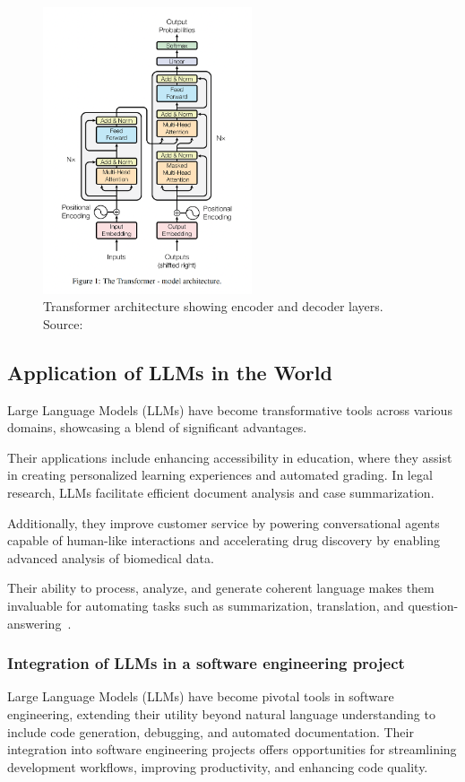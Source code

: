 \begin{figure}[h!]
    \centering
    \includegraphics[width=0.55\textwidth]{Assets/transformer_architecture.png}
    \caption{Transformer architecture showing encoder and decoder layers. Source: \cite{vaswani2017attention}}
    \label{fig:transformer_architecture}
\end{figure}

\subsection{Application of LLMs in the World}

Large Language Models (LLMs) have become transformative tools across various domains, showcasing a blend of significant advantages. 

Their applications include enhancing accessibility in education, where they assist in creating personalized learning experiences and automated grading. In legal research, LLMs facilitate efficient document analysis and case summarization. 

Additionally, they improve customer service by powering conversational agents capable of human-like interactions and accelerating drug discovery by enabling advanced analysis of biomedical data. 

Their ability to process, analyze, and generate coherent language makes them invaluable for automating tasks such as summarization, translation, and question-answering~\cite{application_llms}.

\subsubsection{Integration of LLMs in a software engineering project}
Large Language Models (LLMs) have become pivotal tools in software engineering, extending their utility beyond natural language understanding to include code generation, debugging, and automated documentation. Their integration into software engineering projects offers opportunities for streamlining development workflows, improving productivity, and enhancing code quality.

